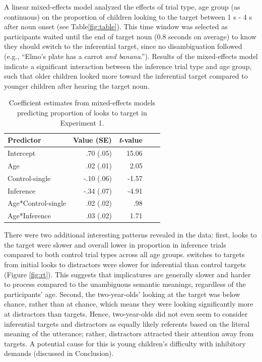 \documentclass[10pt,letterpaper]{article}
\begin{document}
A linear mixed-effects model analyzed the effects of trial type, age group (as continuous) on the proportion of children looking to the target between 1 s - 4 s after noun onset (see Table\ref{fig:table}). This time window was selected as participants waited until the end of target noun (0.8 seconds on average) to know they should switch to the inferential target, since no disambiguation followed (e.g., ``Elmo's plate has a carrot \emph{and banana}.''). Results of the mixed-effects model indicate a significant interaction between the inference trial type and age group, such that older children looked more toward the inferential target compared to younger children after hearing the target noun.

\begin{table}[!b]
\begin{center} 
\caption{Coefficient estimates from mixed-effects models predicting proportion of looks to target in Experiment 1.} 
\label{tab:table} 
\vskip 0.12in
\begin{tabular}{l r r r l} 
\hline
Predictor  &  Value (SE) & \emph{t}-value\\
\hline
Intercept  & .70 (.05) & 15.06 \\
Age & .02 (.01) &  2.05 \\
Control-single & -.10 (.06) & -1.57 \\
Inference & -.34 (.07) & -4.91 \\
Age*Control-single & .02 (.02) & .98 \\
Age*Inference & .03 (.02) & 1.71 \\
\hline
\end{tabular} 
\end{center} 
\end{table}

There were two additional interesting patterns revealed in the data: first, looks to the target were slower and overall lower in proportion in inference trials compared to both control trial types across all age groups. switches to targets from initial looks to distractors were slower for inferential than control targets (Figure \ref{fig:rt}). This suggests that implicatures are generally slower and harder to process compared to the unambiguous semantic meanings, regardless of the participants' age. Second, the two-year-olds' looking at the target was below chance, rather than at chance, which means they were looking significantly more at distractors than targets. Hence, two-year-olds did not even seem to consider inferential targets and distractors as equally likely referents based on the literal meaning of the utterance; rather, distractors attracted their attention away from targets. A potential cause for this is young children's difficulty with inhibitory demands (discussed in Conclusion). 
\end{document}
